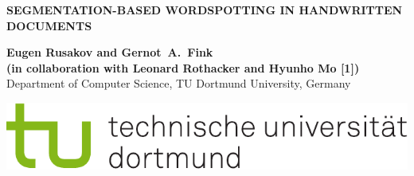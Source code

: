 \documentclass[a0,portrait]{a0poster}
\begin{document}
\sf\huge\noindent\color{tucol2}\hspace*{-4mm}
\textbf{\MakeUppercase{Segmentation-based Wordspotting in Handwritten Documents}}\color{Black}
\vspace*{15mm}


\noindent \begin{minipage}[b]{0.7\linewidth}
\LARGE\textbf{Eugen Rusakov and Gernot~A.~Fink\\
\large
(in collaboration with Leonard Rothacker and Hyunho Mo [1])
}\\[0.5cm] 
\Large
Department of Computer Science, TU Dortmund University, Germany
\end{minipage}
\begin{minipage}[t]{0.3\linewidth}
\hspace*{-5cm}
\includegraphics[width=25cm]{tud_logo_rgb.pdf}
\end{minipage}
\vspace*{-20mm}
\end{document}

